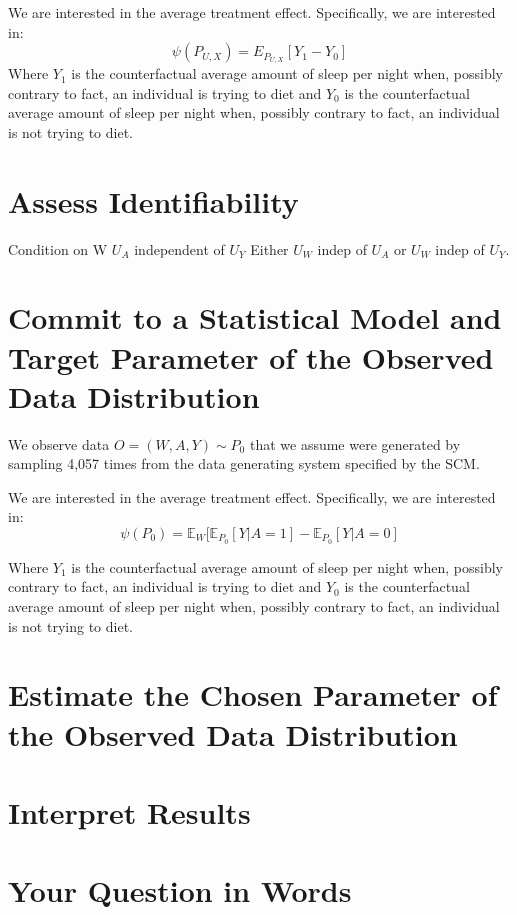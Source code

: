 \documentclass{article}
\begin{document}
We are interested in the average treatment effect. Specifically, we are interested in:
$$\psi(P_{U,X}) = E_{P_{U,X}}[Y_1-Y_0]$$
Where $Y_1$ is the counterfactual average amount of sleep per night when, possibly contrary to fact, an individual is trying to diet and $Y_0$ is the counterfactual average amount of sleep per night when, possibly contrary to fact, an individual is not trying to diet.


\section{Assess Identifiability}

Condition on W
$U_A$ independent of $U_Y$
Either $U_W$ indep of $U_A$ or $U_W$ indep of $U_Y$.

\section{Commit to a Statistical Model and Target Parameter of the Observed Data Distribution}

We observe data $O = (W, A, Y) \sim P_0$ that we assume were generated by sampling 4,057 times from the data generating system specified by the SCM.

We are interested in the average treatment effect. Specifically, we are interested in:
$$\psi(P_{0}) =\mathbb{E}_W[\mathbb{E}_{P_{0}}[Y|A=1] - \mathbb{E}_{P_{0}}[Y|A=0] $$

Where $Y_1$ is the counterfactual average amount of sleep per night when, possibly contrary to fact, an individual is trying to diet and $Y_0$ is the counterfactual average amount of sleep per night when, possibly contrary to fact, an individual is not trying to diet.


\section{Estimate the Chosen Parameter of the Observed Data Distribution}

\section{Interpret Results}




\section{Your Question in Words}
\end{document}
